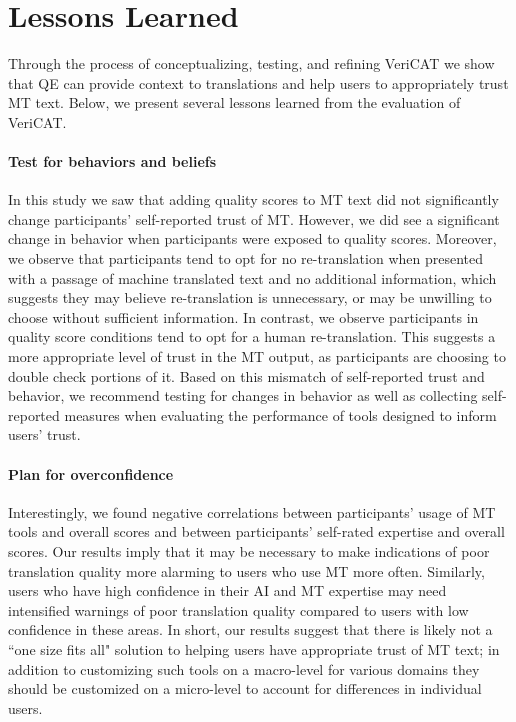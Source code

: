 \section{Lessons Learned}

Through the process of conceptualizing, testing, and refining VeriCAT we show that QE can provide context to translations and help users to appropriately trust MT text.  
Below, we present several lessons learned from the evaluation of VeriCAT.     

\paragraph{\textbf{Test for behaviors and beliefs}} In this study we saw that adding quality scores to MT text did not significantly change participants' self-reported trust of MT. However, we did see a significant change in behavior when participants were exposed to quality scores. Moreover, we observe that participants tend to opt for no re-translation when presented with a passage of machine translated text and no additional information, which suggests they may believe re-translation is unnecessary, or may be unwilling to choose without sufficient information. In contrast, we observe participants in quality score conditions tend to opt for a human re-translation. This suggests a more appropriate level of trust in the MT output, as participants are choosing to double check portions of it. Based on this mismatch of self-reported trust and behavior, we recommend testing for changes in behavior as well as collecting self-reported measures when evaluating the performance of tools designed to inform users' trust.     

\paragraph{\textbf{Plan for overconfidence}} Interestingly, we found negative correlations between participants' usage of MT tools and overall scores and between participants' self-rated expertise and overall scores. Our results imply that it may be necessary to make indications of poor translation quality more alarming to users who use MT more often. Similarly, users who have high confidence in their AI and MT expertise may need intensified warnings of poor translation quality compared to users with low confidence in these areas. In short, our results suggest that there is likely not a ``one size fits all" solution to helping users have appropriate trust of MT text; in addition to customizing such tools on a macro-level for various domains they should be customized on a micro-level to account for differences in individual users.   

